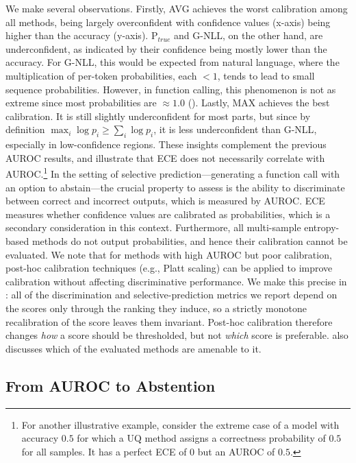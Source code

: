 We make several observations. 
Firstly, {AVG} achieves the worst calibration among all methods, being largely overconfident with confidence values (x-axis) being higher than the accuracy (y-axis).
{P}$_{true}$ and {G-NLL}, on the other hand, are underconfident, as indicated by their confidence being mostly lower than the accuracy. 
For {G-NLL}, this would be expected from natural language, where the multiplication of per-token probabilities, each $<1$, tends to lead to small sequence probabilities. 
However, in function calling, this phenomenon is not as extreme since most probabilities are $\approx 1.0$ (). 
Lastly, {MAX} achieves the best calibration. 
It is still slightly underconfident for most parts, but since by definition $\max_i \log p_i \geq \sum_i \log p_i$, it is less underconfident than {G-NLL}, especially in low-confidence regions.
These insights complement the previous AUROC results, and illustrate that ECE does not necessarily correlate with AUROC.\footnote{For another illustrative example, consider the extreme case of a model with accuracy $0.5$ for which a UQ method assigns a correctness probability of $0.5$ for all samples. It has a perfect ECE of $0$ but an AUROC of $0.5$.}
In the setting of selective prediction---generating a function call with an option to abstain---the crucial property to assess is the ability to discriminate between correct and incorrect outputs, which is measured by AUROC. ECE measures whether confidence values are calibrated as probabilities, which is a secondary consideration in this context. Furthermore, all multi-sample entropy-based methods do not output probabilities, and hence their calibration cannot be evaluated.
We note that for methods with high AUROC but poor calibration, post-hoc calibration techniques (e.g., Platt scaling) can be applied to improve calibration without affecting discriminative performance.
We make this precise in : all of the discrimination and selective-prediction metrics we report depend on the scores only through the ranking they induce, so a strictly monotone recalibration of the score leaves them invariant. Post-hoc calibration therefore changes \emph{how} a score should be thresholded, but not \emph{which} score is preferable.  also discusses which of the evaluated methods are amenable to it.


\subsection{From AUROC to Abstention}
\label{sec:selective_prediction}

